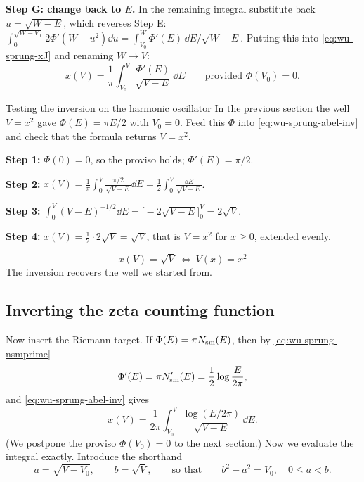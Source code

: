 \textbf{Step G: change back to $E$.} In the remaining integral substitute back $u=\sqrt{W-E}$, which reverses Step E: $\int_0^{\sqrt{W-V_0}}2\Phi'(W-u^2)\dd u=\int_{V_0}^{W}\Phi'(E)\,\dd E/\sqrt{W-E}$. Putting this into \eqref{eq:wu-sprung-xJ} and renaming $W\to V$:
\begin{equation}
\boxed{\;x(V)=\frac1\pi\int_{V_0}^{V}\frac{\Phi'(E)}{\sqrt{V-E}}\,\dd E\qquad\text{provided }\Phi(V_0)=0.\;}
\label{eq:wu-sprung-abel-inv}
\end{equation}

\begin{sample}{Testing the inversion on the harmonic oscillator}
In the previous section the well $V=x^2$ gave $\Phi(E)=\pi E/2$ with $V_0=0$. Feed this $\Phi$ into \eqref{eq:wu-sprung-abel-inv} and check that the formula returns $V=x^2$.

\textbf{Step 1:} $\Phi(0)=0$, so the proviso holds; $\Phi'(E)=\pi/2$.

\textbf{Step 2:} $x(V)=\frac1\pi\int_0^V\frac{\pi/2}{\sqrt{V-E}}\dd E=\frac12\int_0^V\frac{\dd E}{\sqrt{V-E}}$.

\textbf{Step 3:} $\int_0^V(V-E)^{-1/2}\dd E=\bigl[-2\sqrt{V-E}\bigr]_0^V=2\sqrt V$.

\textbf{Step 4:} $x(V)=\tfrac12\cdot2\sqrt V=\sqrt V$, that is $V=x^2$ for $x\ge0$, extended evenly.

\[
\boxed{x(V)=\sqrt V\ \Longleftrightarrow\ V(x)=x^2}
\]
The inversion recovers the well we started from.
\end{sample}

\subsection{Inverting the zeta counting function}

Now insert the Riemann target. If $\Phi(E)=\pi N_{\mathrm{sm}}(E)$, then by \eqref{eq:wu-sprung-nsmprime}
\begin{equation}
\Phi'(E)=\pi N_{\mathrm{sm}}'(E)=\frac12\log\frac{E}{2\pi},
\label{eq:wu-sprung-phiprime}
\end{equation}
and \eqref{eq:wu-sprung-abel-inv} gives
\begin{equation}
x(V)=\frac{1}{2\pi}\int_{V_0}^{V}\frac{\log(E/2\pi)}{\sqrt{V-E}}\,\dd E .
\label{eq:wu-sprung-xint}
\end{equation}
(We postpone the proviso $\Phi(V_0)=0$ to the next section.) Now we evaluate the integral exactly. Introduce the shorthand
\begin{equation}
a=\sqrt{V-V_0},\qquad b=\sqrt V,\qquad\text{so that}\qquad b^2-a^2=V_0,\quad 0\le a<b .
\label{eq:wu-sprung-ab}
\end{equation}

